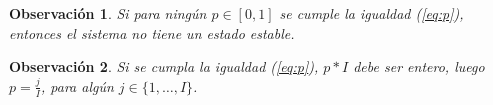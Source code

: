 \documentclass{article}
\newtheorem{obs}{Observación}
\begin{document}
\begin{obs}
Si para ningún $p\in[0,1]$ se cumple la igualdad (\ref{eq:p}), entonces el sistema no tiene un estado estable.
\end{obs}

\begin{obs}
Si se cumpla la igualdad (\ref{eq:p}), $p*I$ debe ser entero, luego $p=\frac{j}{I}$, para algún $j\in\{1,\ldots,I\}$.
\end{obs}
\end{document}
